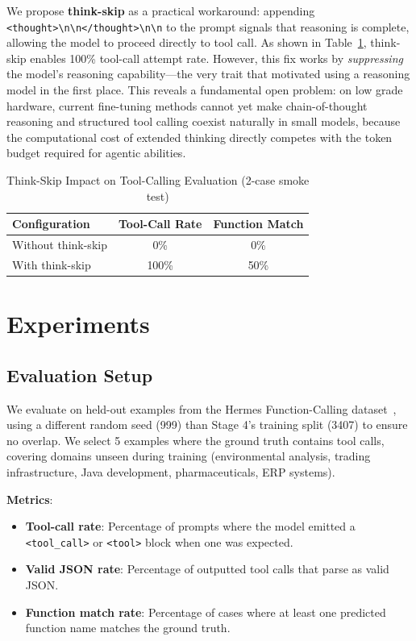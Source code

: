 \documentclass[conference]{IEEEtran}
\begin{document}
We propose \textbf{think-skip} as a practical workaround: appending \texttt{<thought>\textbackslash n\textbackslash n</thought>\textbackslash n\textbackslash n} to the prompt signals that reasoning is complete, allowing the model to proceed directly to tool call. As shown in Table~\ref{tab:thinkskip}, think-skip enables 100\% tool-call attempt rate. However, this fix works by \textit{suppressing} the model's reasoning capability---the very trait that motivated using a reasoning model in the first place. This reveals a fundamental open problem: on low grade hardware, current fine-tuning methods cannot yet make chain-of-thought reasoning and structured tool calling coexist naturally in small models, because the computational cost of extended thinking directly competes with the token budget required for agentic abilities.

\begin{table}[t]
\centering
\caption{Think-Skip Impact on Tool-Calling Evaluation (2-case smoke test)}
\label{tab:thinkskip}
\begin{tabular}{lcc}
\toprule
\textbf{Configuration} & \textbf{Tool-Call Rate} & \textbf{Function Match} \\
\midrule
Without think-skip & 0\% & 0\% \\
With think-skip & 100\% & 50\% \\
\bottomrule
\end{tabular}
\end{table}

\section{Experiments}
\label{sec:experiments}

\subsection{Evaluation Setup}
We evaluate on held-out examples from the Hermes Function-Calling dataset~\cite{nousresearch2024hermes}, using a different random seed (999) than Stage 4's training split (3407) to ensure no overlap. We select 5 examples where the ground truth contains tool calls, covering domains unseen during training (environmental analysis, trading infrastructure, Java development, pharmaceuticals, ERP systems).

\textbf{Metrics}:
\begin{itemize}
\item \textbf{Tool-call rate}: Percentage of prompts where the model emitted a \texttt{<tool\_call>} or \texttt{<tool>} block when one was expected.
\item \textbf{Valid JSON rate}: Percentage of outputted tool calls that parse as valid JSON.
\item \textbf{Function match rate}: Percentage of cases where at least one predicted function name matches the ground truth.
\end{itemize}
\end{document}
